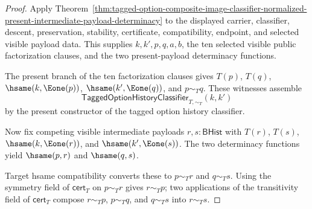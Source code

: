 \begin{proof}
Apply
Theorem~\ref{thm:tagged-option-composite-image-classifier-normalized-present-intermediate-payload-determinacy}
to the displayed carrier, classifier, descent, preservation, stability,
certificate, compatibility, endpoint, and selected visible payload data. This
supplies $k,k',p,q,a,b$, the ten selected visible public factorization clauses,
and the two present-payload determinacy functions.

The present branch of the ten factorization clauses gives $T(p)$, $T(q)$,
$\hsame(k,\Eone(p))$, $\hsame(k',\Eone(q))$, and $p\sim_T q$. These witnesses
assemble
$$
\mathsf{TaggedOptionHistoryClassifier}_{T,\sim_T}(k,k')
$$
by the present constructor of the tagged option history classifier.

Now fix competing visible intermediate payloads $r,s:\mathsf{BHist}$ with
$T(r)$, $T(s)$, $\hsame(k,\Eone(r))$, and $\hsame(k',\Eone(s))$. The two
determinacy functions yield $\hsame(p,r)$ and $\hsame(q,s)$.

Target hsame compatibility converts these to $p\sim_T r$ and $q\sim_T s$.
Using the symmetry field of $\mathsf{cert}_T$ on $p\sim_T r$ gives
$r\sim_T p$; two applications of the transitivity field of $\mathsf{cert}_T$
compose $r\sim_T p$, $p\sim_T q$, and $q\sim_T s$ into $r\sim_T s$.
\end{proof}


